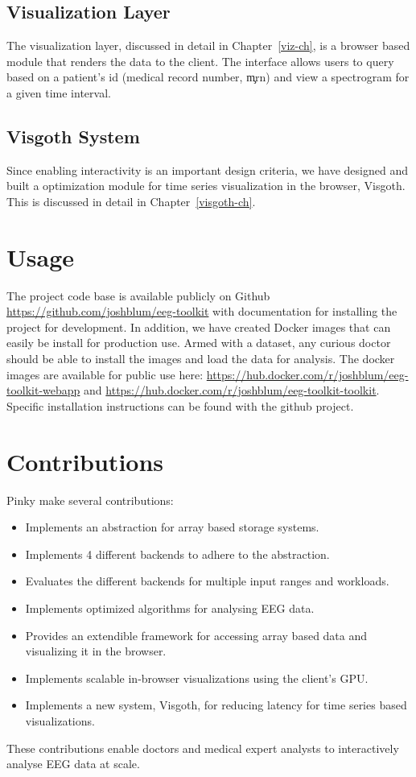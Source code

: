 \subsection{Visualization Layer}

The visualization layer, discussed in detail in Chapter~\ref{viz-ch}, is a browser
based module that renders the data to the client. The interface allows users to
query based on a patient's id (medical record number, \c{mrn}) and view a spectrogram
for a given time interval.

\subsection{Visgoth System}

Since enabling interactivity is an important design criteria, we have designed
and built a optimization module for time series visualization in the browser,
Visgoth. This is discussed in detail in Chapter~\ref{visgoth-ch}.

\section{Usage}

The project code base is available publicly on Github \cite{github}
\url{https://github.com/joshblum/eeg-toolkit} with documentation for installing
the project for development. In addition, we have created Docker \cite{docker}
images that can easily be install for production use. Armed with a dataset, any
curious doctor should be able to install the images and load the data for
analysis. The docker images are available for public use here:
\url{https://hub.docker.com/r/joshblum/eeg-toolkit-webapp} and
\url{https://hub.docker.com/r/joshblum/eeg-toolkit-toolkit}. Specific
installation instructions can be found with the github project.

\section{Contributions}

Pinky make several contributions:

\begin{itemize}
  \item Implements an abstraction for array based storage systems.
  \item Implements 4 different backends to adhere to the abstraction.
  \item Evaluates the different backends for multiple input ranges and workloads.
  \item Implements optimized algorithms for analysing EEG data.
  \item Provides an extendible framework for accessing array based data and visualizing it in the browser.
  \item Implements scalable in-browser visualizations using the client's GPU.
  \item Implements a new system, Visgoth, for reducing latency for time series based visualizations.
\end{itemize}

These contributions enable doctors and medical expert analysts to interactively
analyse EEG data at scale.

